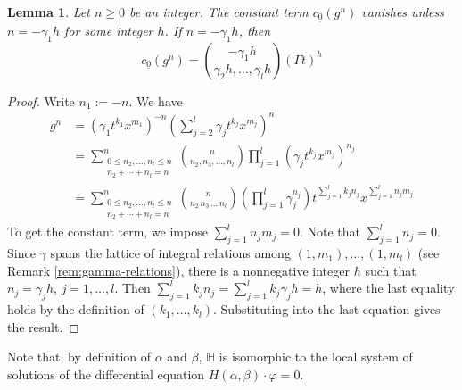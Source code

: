 \documentclass[11pt, reqno]{amsart}
\theoremstyle{plain}
\newtheorem{lem}[thm]{Lemma}
\theoremstyle{definition}
\newcommand{\HH}{\mathbb{H}}
\newcommand{\ga}{\gamma}
\begin{document}
\begin{lem}\label{lem:constant-term}
Let $n\ge0$ be an integer. The constant term $c_{\underline{0}}(g^n)$ vanishes unless $n =-\ga_1h$ for some integer $h$. If $n=-\ga_1 h$, then
\[
c_{\underline{0}}(g^n)=\binom{-\ga_1h   } { \ga_2  h,  \dots  ,\ga_l h} (\Gamma t)^{h}
\]
\end{lem}
\begin{proof}

Write $n_1 :=-n$. We have
\begin{align*}
    g^n &= (\gamma_1 t^{k_1} x^{m_1})^{-n}  \left(\sum_{j=2}^{l} \gamma_j t^{k_j} x^{m_j}\right)^n\\
    &=\sum_{\substack{0\le n_2,\dots,n_l\le n \\ n_2+\cdots+n_l=n}}^n \binom{n}{n_2, n_3,  \dots , n_l} \prod_{j=1}^l  (\gamma_j t^{k_j} x^{m_j})^{n_j}\\
    &=\sum_{\substack{0\le n_2,\dots,n_l\le n \\ n_2+\cdots+n_l=n}}^n \binom{n}{n_2\, n_3\,  \dots \, n_l} \left(\prod_{j=1}^l  \gamma_j^{n_j} \right) 
     t^{\sum_{j=1}^l k_j n_j}  x^{\sum_{j=1}^l n_jm_j}
\end{align*}
To get the constant term, we impose $\sum_{j=1}^l n_jm_j=0$.
Note that $\sum_{j=1}^l n_j= 0$. 
Since $\gamma$ spans the lattice of integral relations among $(1,m_1), \dots ,(1,m_l)$ (see Remark \ref{rem:gamma-relations}), there is a nonnegative integer $h$ such that $n_j =  \ga_j h$, $j=1,\dots, l$. Then
$\sum_{j=1}^l k_j n_j =\sum_{j=1}^l k_j \ga_j h=  h$, where the last equality holds by the definition of $(k_1, \dots, k_l)$.
Substituting into the last equation gives the result.
\end{proof}
\smallskip

Note that, by definition of $\alpha$ and $\beta$, $\HH$ is isomorphic to the local system of solutions of the differential equation $H(\alpha, \beta)\cdot \varphi=0$.
\end{document}
